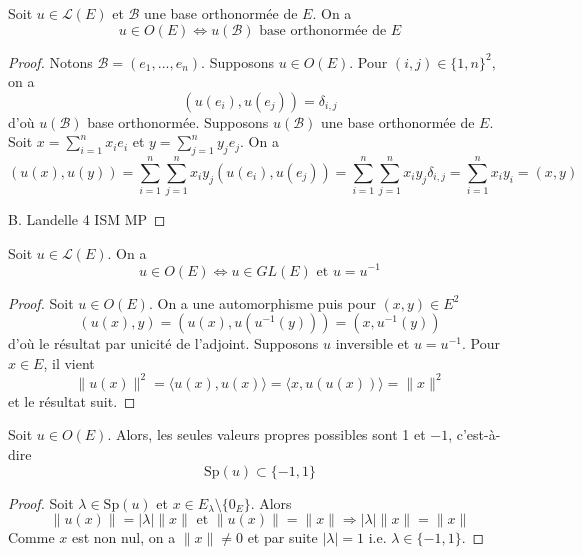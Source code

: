 \begin{theorem}
\label{thm:2}

Soit $u \in \mathcal{L}(E)$ et $\mathcal{B}$ une base orthonormée de $E$. On a
\[
u \in O(E) \iff u(\mathcal{B}) \text{ base orthonormée de } E
\]

\end{theorem}

\begin{proof}

Notons $\mathcal{B} = (e_1, ..., e_n)$. Supposons $u \in O(E)$. Pour $(i, j) \in \{1, n\}^2$, on a
\[
(u(e_i), u(e_j)) = \delta_{i, j}
\]
d'où $u(\mathcal{B})$ base orthonormée. Supposons $u(\mathcal{B})$ une base orthonormée de $E$. Soit $x = \sum_{i=1}^n x_i e_i$ et $y = \sum_{j=1}^n y_j e_j$. On a
\[
(u(x), u(y)) = \sum_{i=1}^n \sum_{j=1}^n x_i y_j (u(e_i), u(e_j)) = \sum_{i=1}^n \sum_{j=1}^n x_i y_j \delta_{i, j} = \sum_{i=1}^n x_i y_i = (x, y)
\]

B. Landelle
\hfill 4
\hfill ISM MP

\end{proof}

\begin{theorem}
\label{thm:3}

Soit $u \in \mathcal{L}(E)$. On a
\[
u \in O(E) \Leftrightarrow u \in GL(E) \text{ et } u = u^{-1}
\]
\end{theorem}

\begin{proof}

Soit $u \in O(E)$. On a une automorphisme puis pour $(x,y) \in E^2$
\[
(u(x),y) = (u(x), u(u^{-1}(y))) = (x, u^{-1}(y))
\]
d'où le résultat par unicité de l'adjoint. Supposons $u$ inversible et $u = u^{-1}$. Pour $x \in E$, il vient
\[
\|u(x)\|^2 = \langle u(x), u(x) \rangle = \langle x, u(u(x)) \rangle = \|x\|^2
\]
et le résultat suit.

\end{proof}

\begin{proposition}
\label{prop:8}

Soit $u \in O(E)$. Alors, les seules valeurs propres possibles sont 1 et $-1$, c'est-à-dire
\[
\text{Sp}(u) \subset \{-1, 1\}
\]
\end{proposition}

\begin{proof}

Soit $\lambda \in \text{Sp}(u)$ et $x \in E_ \lambda \setminus \{0_E\}$. Alors
\[
\|u(x)\| = |\lambda| \|x\| \text{ et } \|u(x)\| = \|x\| \Rightarrow |\lambda| \|x\| = \|x\|
\]
Comme $x$ est non nul, on a $\|x\| \neq 0$ et par suite $|\lambda| = 1$ i.e. $\lambda \in \{-1, 1\}$.

\end{proof}


